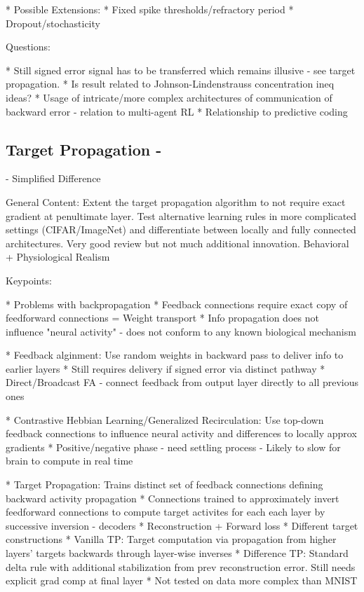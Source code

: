\documentclass[colorinlistoftodos]{article}
\theoremstyle{definition}
\begin{document}
* Possible Extensions:
    * Fixed spike thresholds/refractory period
    * Dropout/stochasticity

Questions:

* Still signed error signal has to be transferred which remains illusive - see target propagation.
* Is result related to Johnson-Lindenstrauss concentration ineq ideas?
* Usage of intricate/more complex architectures of communication of backward error - relation to multi-agent RL
* Relationship to predictive coding


\subsection*{Target Propagation - \citet{lee2015, bartunov2018}}


\citet{bartunov2018} - Simplified Difference

General Content: Extent the target propagation algorithm to not require exact gradient at penultimate layer. Test alternative learning rules in more complicated settings (CIFAR/ImageNet) and differentiate between locally and fully connected architectures. Very good review but not much additional innovation. Behavioral + Physiological Realism


Keypoints:

* Problems with backpropagation
    * Feedback connections require exact copy of feedforward connections = Weight transport
    * Info propagation does not influence "neural activity" - does not conform to any known biological mechanism

* Feedback alginment: Use random weights in backward pass to deliver info to earlier layers
    * Still requires delivery if signed error via distinct pathway
    * Direct/Broadcast FA - connect feedback from output layer directly to all previous ones

* Contrastive Hebbian Learning/Generalized Recirculation: Use top-down feedback connections to influence neural activity and differences to locally approx gradients
    * Positive/negative phase - need settling process - Likely to slow for brain to compute in real time

* Target Propagation: Trains distinct set of feedback connections defining backward activity propagation
    * Connections trained to approximately invert feedforward connections to compute target activites for each each layer by successive inversion - decoders
        * Reconstruction + Forward loss
        * Different target constructions
    * Vanilla TP: Target computation via propagation from higher layers' targets backwards through layer-wise inverses
    * Difference TP: Standard delta rule with additional stabilization from prev reconstruction error. Still needs explicit grad comp at final layer
    * Not tested on data more complex than MNIST
\end{document}
